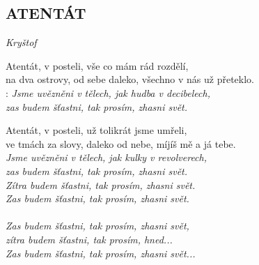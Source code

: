 \begin{flushleft}
	\section*{\Huge ATENTÁT}
	\emph{Kryštof}
\end{flushleft}

Atentát, v posteli, vše co mám rád rozdělí,\\
na dva ostrovy, od sebe daleko, všechno v nás už přeteklo.\\

\textregistered:
\emph{
Jsme uvězněni v tělech, jak hudba v decibelech, \hspace{0.6cm}\\
zas budem šťastni, tak prosím, zhasni svět.\\
}

Atentát, v posteli, už tolikrát jsme umřeli,\\
ve tmách za slovy, daleko od nebe, míjíš mě a já tebe.\\

\emph{
Jsme uvězněni v tělech, jak kulky v revolverech,\\
zas budem šťastni, tak prosím, zhasni svět.\\
Zítra budem šťastni, tak prosím, zhasni svět.\\
Zas budem šťastni, tak prosím, zhasni svět.\\
\\
Zas budem šťastni, tak prosím, zhasni svět,\\
zítra budem šťastni, tak prosím, hned...\\
Zas budem šťastni, tak prosím, zhasni svět...\\
}
\newpage